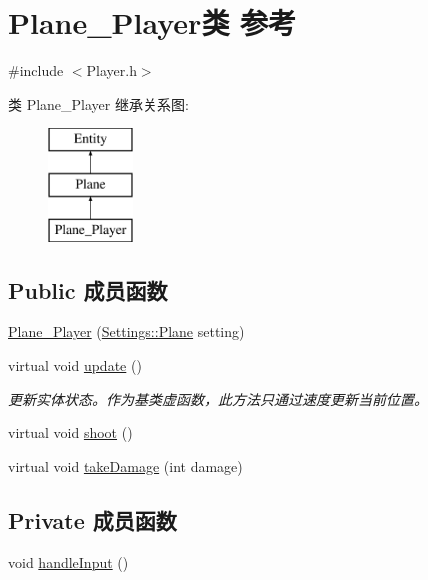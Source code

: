 \hypertarget{class_plane___player}{}\section{Plane\+\_\+\+Player类 参考}
\label{class_plane___player}


{\ttfamily \#include $<$Player.\+h$>$}

类 Plane\+\_\+\+Player 继承关系图\+:\begin{figure}[H]
\begin{center}
\leavevmode
\includegraphics[height=3.000000cm]{class_plane___player}
\end{center}
\end{figure}
\subsection*{Public 成员函数}
\begin{DoxyCompactItemize}
\item 
\hyperlink{class_plane___player_ae07c92eb62cd45f7fd5d12fb570934e2}{Plane\+\_\+\+Player} (\hyperlink{struct_settings_1_1_plane}{Settings\+::\+Plane} setting)
\item 
virtual void \hyperlink{class_plane___player_ae68c08ce11fad9fd164c00eb4db6b348}{update} ()
\begin{DoxyCompactList}\small\item\em 更新实体状态。作为基类虚函数，此方法只通过速度更新当前位置。 \end{DoxyCompactList}\item 
virtual void \hyperlink{class_plane___player_a3ffa86506370f74ec859e74d42c568c2}{shoot} ()
\item 
virtual void \hyperlink{class_plane___player_a40e7f20858e2738e5a72b15eb1c28421}{take\+Damage} (int damage)
\end{DoxyCompactItemize}
\subsection*{Private 成员函数}
\begin{DoxyCompactItemize}
\item 
void \hyperlink{class_plane___player_a7a356939196bfe1447fbd5fc03b8c380}{handle\+Input} ()
\end{DoxyCompactItemize}
